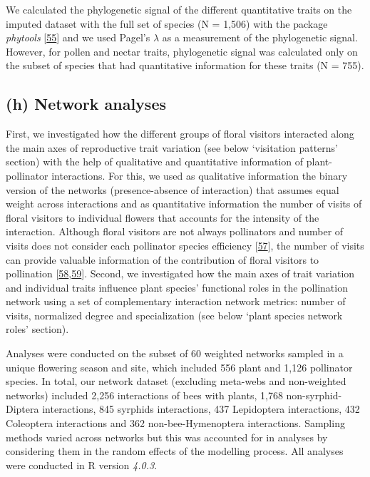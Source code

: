 \documentclass[
  12pt,
  a4paper,
]{article}
\begin{document}
We calculated the phylogenetic signal of the different quantitative traits on the imputed dataset with the full set of species (N = 1,506) with the package \emph{phytools} {[}\protect\hyperlink{ref-revell2012}{55}{]} and we used Pagel's \(\lambda\) as a measurement of the phylogenetic signal. However, for pollen and nectar traits, phylogenetic signal was calculated only on the subset of species that had quantitative information for these traits (N = 755).

\hypertarget{h-network-analyses}{%
\subsection{(h) Network analyses}\label{h-network-analyses}}

First, we investigated how the different groups of floral visitors interacted along the main axes of reproductive trait variation (see below `visitation patterns' section) with the help of qualitative and quantitative information of plant-pollinator interactions. For this, we used as qualitative information the binary version of the networks (presence-absence of interaction) that assumes equal weight across interactions and as quantitative information the number of visits of floral visitors to individual flowers that accounts for the intensity of the interaction. Although floral visitors are not always pollinators and number of visits does not consider each pollinator species efficiency {[}\protect\hyperlink{ref-ballantyne2015}{57}{]}, the number of visits can provide valuable information of the contribution of floral visitors to pollination {[}\protect\hyperlink{ref-vazquez2005}{58},\protect\hyperlink{ref-vazquez2012}{59}{]}. Second, we investigated how the main axes of trait variation and individual traits influence plant species' functional roles in the pollination network using a set of complementary interaction network metrics: number of visits, normalized degree and specialization (see below `plant species network roles' section).

Analyses were conducted on the subset of 60 weighted networks sampled in a unique flowering season and site, which included 556 plant and 1,126 pollinator species. In total, our network dataset (excluding meta-webs and non-weighted networks) included 2,256 interactions of bees with plants, 1,768 non-syrphid-Diptera interactions, 845 syrphids interactions, 437 Lepidoptera interactions, 432 Coleoptera interactions and 362 non-bee-Hymenoptera interactions. Sampling methods varied across networks but this was accounted for in analyses by considering them in the random effects of the modelling process. All analyses were conducted in R version \emph{4.0.3}.
\end{document}
